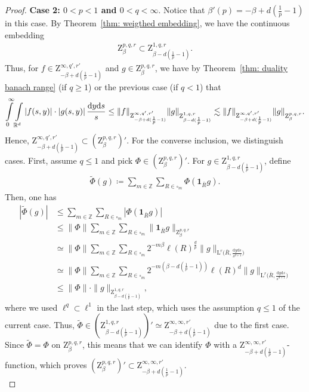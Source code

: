 \documentclass[11pt, leqno,parskip=half]{amsart}
\theoremstyle{definition}
\newcommand{\IR}{\mathbb{R}}
\newcommand{\IZ}{\mathbb{Z}}
\renewcommand{\L}{\mathrm{L}}
\newcommand{\Z}{\mathrm{Z}}
\renewcommand{\d}{\mathrm{d}}
\numberwithin{equation}{section}
\begin{document}
\begin{proof}
    \noindent \textbf{Case 2: $0<p<1$ and $0<q<\infty$}.
    Notice that $\beta'(p)=-\beta +d(\frac{1}{p}-1)$ in this case. By Theorem~\ref{thm: weigthed embedding}, we have the continuous embedding
    \begin{align*}
         \Z^{p,q,r}_\beta \subset \Z^{1,q,r}_{\beta-d(\frac{1}{p}-1)}.
    \end{align*}
    Thus, for $f\in \Z^{\infty,q',r'}_{-\beta+d(\frac{1}{p}-1)}$ and $g\in \Z^{p,q,r}_\beta$, we have by Theorem~\ref{thm: duality banach range} (if $q\geq 1$) or the previous case (if $q<1$) that
    \begin{align*}
        \int\limits_{0}^\infty\int\limits_{\IR^d} |f(s,y)|\cdot |g(s,y)|\,\frac{\d y \d s}{s} \leq \|f\|_{ \Z^{\infty,q',r'}_{-\beta+d(\frac{1}{p}-1)}}  \|g\|_{ \Z^{\vphantom{p',q',r'}1,q,r}_{\beta-d(\frac{1}{p}-1)}}\lesssim \|f\|_{ \Z^{\infty,q',r'}_{-\beta+d(\frac{1}{p}-1)}}  \|g\|_{ \Z^{\vphantom{p',q',r'}p,q,r}_\beta }.
    \end{align*}
    Hence, $ \Z^{\infty,q',r'}_{-\beta+d(\frac{1}{p}-1)}\subset ( \Z^{p,q,r}_\beta )'$. For the converse inclusion, we distinguish cases. First, assume $q\leq 1$ and pick $\Phi \in ( \Z^{p,q,r}_\beta )'$. For $g\in  \Z^{1,q,r}_{\beta-d(\frac{1}{p}-1)}$, define
    \begin{align*}
        \tilde \Phi (g) \coloneqq \sum\limits_{m\in\IZ} \sum\limits_{R\in\square_m} \Phi(\mathbf{1}_{\bar R}g).
    \end{align*}
    Then, one has
    \begin{align*}
        |\tilde \Phi (g)| &\leq \sum\limits_{m\in\IZ} \sum\limits_{R\in\square_m} |\Phi(\mathbf{1}_{\bar R}g)|\\
        &\leq \|\Phi\|\sum\limits_{m\in\IZ} \sum\limits_{R\in\square_m} \|\mathbf{1}_{\bar R} g\|_{\Z^{p,q,r}_\beta}\\
        &\simeq  \|\Phi\|\sum\limits_{m\in\IZ} \sum\limits_{R\in\square_m} 2^{-m\beta}\ell(R)^\frac{d}{p}\| g\|_{\L^r\big(\bar R, \frac{\d y \d s}{s^{d+1}}\big)}\\
        &\simeq  \|\Phi\|\sum\limits_{m\in\IZ} \sum\limits_{R\in\square_m} 2^{-m(\beta-d(\frac{1}{p}-1))}\ell(R)^d\| g\|_{\L^r\big(\bar R, \frac{\d y \d s}{s^{d+1}}\big)}\\
        &\leq \|\Phi\|\cdot \|g\|_{\Z^{1,q,r}_{\beta-d(\frac{1}{p}-1)}},
    \end{align*}
    where we used $\ell^q \subset \ell^1$ in the last step, which uses the assumption $q \leq 1$ of the current case.
    Thus, $\tilde \Phi \in (\Z^{1,q,r}_{\beta-d(\frac{1}{p}-1)})' \simeq \Z^{\infty,\infty,r'}_{-\beta+d(\frac{1}{p}-1)}$ due to the first case. Since $\tilde \Phi = \Phi$ on $\Z^{p,q,r}_\beta$, this means that we can identify $\Phi$ with a $ \Z^{\infty,\infty,r'}_{-\beta+d(\frac{1}{p}-1)}$-function, which proves $(\Z^{p,q,r}_\beta)'\subset  \Z^{\infty,\infty,r'}_{-\beta+d(\frac{1}{p}-1)}$.\\


\end{proof}
\end{document}
